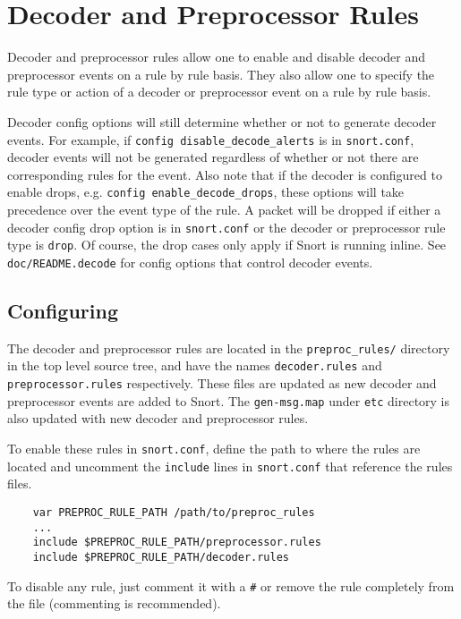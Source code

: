 \documentclass[english]{report}
\begin{document}
\section{Decoder and Preprocessor Rules}

Decoder and preprocessor rules allow one to enable and disable decoder and
preprocessor events on a rule by rule basis.  They also allow one to specify
the rule type or action of a decoder or preprocessor event on a rule by rule
basis.

Decoder config options will still determine whether or not to generate decoder
events.  For example, if \texttt{config disable\_decode\_alerts} is in
\texttt{snort.conf}, decoder events will not be generated regardless of whether
or not there are corresponding rules for the event.  Also note that if the
decoder is configured to enable drops, e.g. \texttt{config
enable\_decode\_drops}, these options will take precedence over the event type
of the rule.  A packet will be dropped if either a decoder config drop option
is in \texttt{snort.conf} or the decoder or preprocessor rule type is
\texttt{drop}.  Of course, the drop cases only apply if Snort is running
inline.  See \texttt{doc/README.decode} for config options that control decoder
events.

\subsection{Configuring}

The decoder and preprocessor rules are located in the \texttt{preproc\_rules/}
directory in the top level source tree, and have the names
\texttt{decoder.rules} and \texttt{preprocessor.rules} respectively.  These
files are updated as new decoder and preprocessor events are added to Snort.
The \texttt{gen-msg.map} under \texttt{etc} directory is also updated with 
new decoder and preprocessor rules.

To enable these rules in \texttt{snort.conf}, define the path to where the
rules are located and uncomment the \texttt{include} lines in
\texttt{snort.conf} that reference the rules files.

\begin{verbatim}
    var PREPROC_RULE_PATH /path/to/preproc_rules
    ...
    include $PREPROC_RULE_PATH/preprocessor.rules
    include $PREPROC_RULE_PATH/decoder.rules
\end{verbatim}

To disable any rule, just comment it with a \texttt{\#} or remove the rule
completely from the file (commenting is recommended).
\end{document}
